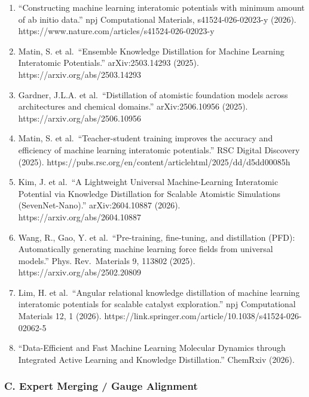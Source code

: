 \documentclass[
  12pt,
]{ctexart}
\providecommand{\tightlist}{%
  \setlength{\itemsep}{0pt}\setlength{\parskip}{0pt}}
\begin{document}
\begin{enumerate}
\def\labelenumi{\arabic{enumi}.}
\setcounter{enumi}{6}
\tightlist
\item
  ``Constructing machine learning interatomic potentials with minimum
  amount of ab initio data.'' npj Computational Materials,
  s41524-026-02023-y (2026).
  https://www.nature.com/articles/s41524-026-02023-y
\item
  Matin, S. et al.~``Ensemble Knowledge Distillation for Machine
  Learning Interatomic Potentials.'' arXiv:2503.14293 (2025).
  https://arxiv.org/abs/2503.14293
\item
  Gardner, J.L.A. et al.~``Distillation of atomistic foundation models
  across architectures and chemical domains.'' arXiv:2506.10956 (2025).
  https://arxiv.org/abs/2506.10956
\item
  Matin, S. et al.~``Teacher-student training improves the accuracy and
  efficiency of machine learning interatomic potentials.'' RSC Digital
  Discovery (2025).
  https://pubs.rsc.org/en/content/articlehtml/2025/dd/d5dd00085h
\item
  Kim, J. et al.~``A Lightweight Universal Machine-Learning Interatomic
  Potential via Knowledge Distillation for Scalable Atomistic
  Simulations (SevenNet-Nano).'' arXiv:2604.10887 (2026).
  https://arxiv.org/abs/2604.10887
\item
  Wang, R., Gao, Y. et al.~``Pre-training, fine-tuning, and distillation
  (PFD): Automatically generating machine learning force fields from
  universal models.'' Phys. Rev.~Materials 9, 113802 (2025).
  https://arxiv.org/abs/2502.20809
\item
  Lim, H. et al.~``Angular relational knowledge distillation of machine
  learning interatomic potentials for scalable catalyst exploration.''
  npj Computational Materials 12, 1 (2026).
  https://link.springer.com/article/10.1038/s41524-026-02062-5
\item
  ``Data-Efficient and Fast Machine Learning Molecular Dynamics through
  Integrated Active Learning and Knowledge Distillation.'' ChemRxiv
  (2026).
\end{enumerate}

\subsubsection{C. Expert Merging / Gauge
Alignment}\label{c.-expert-merging-gauge-alignment}
\end{document}

